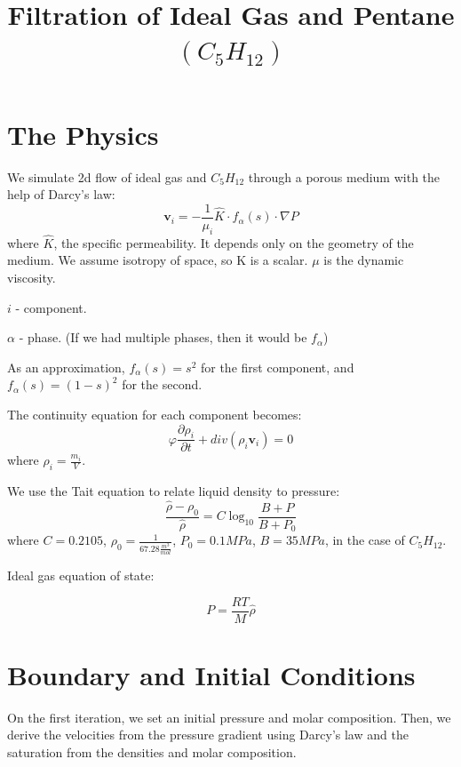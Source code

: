 \documentclass[a4paper,12pt]{article}
\author{}
\date{}
\title{Filtration of Ideal Gas and Pentane
\(\left( C_5 H_{12} \right) \)}
\begin{document}
\maketitle

\section{The Physics}

We simulate 2d flow of ideal gas and \(C_5H_{12}\) through a
porous medium with the help of Darcy's law:
\begin{equation}
    \bm{v}_i = -\frac{1}{\mu_i} \hat K \cdot f_\alpha (s)
    \cdot \nabla P
\end{equation}
where \(\hat K\), the specific permeability.
It depends only on the geometry of the medium.
We assume isotropy of space, so K is a scalar.
\(\mu\) is the dynamic viscosity.

\(i\) - component.

\(\alpha\) - phase. (If we had multiple phases, then
it would be \(f_\alpha\))

As an approximation, \(f_\alpha (s) = s^2\) for the first 
component, and \(f_\alpha (s) = (1 - s)^2\) for the second.

The continuity equation for each component becomes:
\begin{equation}
    \varphi \frac{\partial \rho_i}{\partial t}
    + div (\rho_i \bm{v}_i) = 0
\end{equation}
where \(\rho_i = \frac{m_i}{V}\).

We use the Tait equation to relate liquid density to pressure:
\begin{equation}
    \frac{\hat{\rho} - \rho_0}{\hat{\rho}} = C \log_{10}
    \frac{B + P}{B + P_0}
\end{equation}
where \(C = 0.2105\),
\(\rho_0 = \frac{1}{67.28 \frac{m^3}{mol}}\),
\(P_0 = 0.1 MPa\), \(B = 35MPa\),
in the case of \(C_5H_{12}\).

Ideal gas equation of state:

\begin{equation}
    P = \frac{RT}{M} \hat{\rho}
\end{equation}

\section{Boundary and Initial Conditions}

On the first iteration, we set an initial
pressure and molar composition.
Then, we derive the velocities from the 
pressure gradient using Darcy's law and the
saturation from the densities
and molar composition.
\end{document}
